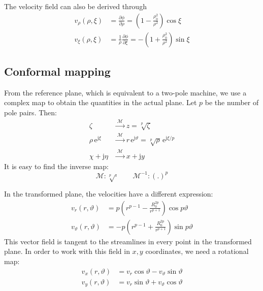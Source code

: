 \documentclass[b5paper,11pt,oneside,fleqn]{article}
\newcommand{\eu}{\mathrm{e}}
\newcommand{\je}{\mathrm{j}}
\newcommand{\te}{\vartheta}
\newcommand{\map}{\mathcal{M}}
\newcommand{\de}{\partial}
\begin{document}
The velocity field can also be derived through
\begin{equation}
\begin{aligned}
v_\rho(\rho,\xi)  &= \frac{\de\phi}{\de\rho} =
           \left( 1 - \frac{\rho_0^2}{\rho^2} \right) \cos\xi \\[1ex]
v_\xi(\rho,\xi)  &= \frac{1}{\rho} \frac{\de\phi}{\de\xi}  =
          -\left( 1 + \frac{\rho_0^2}{\rho^2} \right) \sin\xi
\end{aligned}
\end{equation}




\subsection{Conformal mapping}
From the reference plane, which is equivalent to a two-pole machine,
we use a complex map to obtain the quantities in the actual plane.
Let $ p $ be the number of pole pairs. Then:
\begin{equation}
\begin{aligned}
\zeta              &\xrightarrow{\;\map\;} z = \sqrt[p]{\zeta} \\
\rho\,\eu^{\je\xi} &\xrightarrow{\;\map\;}
                       r \, \eu^{\je\te} = \sqrt[p]{\rho}\,\eu^{\je
                       \xi/p} \\
\chi + \je\eta     &\xrightarrow{\;\map\;} x + \je y
\end{aligned}
\end{equation}
%
It is easy to find the inverse map:
\begin{equation}
\map\colon \sqrt[p]{\cdot} \qquad
\map^{-1}\colon (.)^p
\end{equation}

In the transformed plane, the velocities have a different expression:
\begin{equation}
\begin{aligned}
v_r(r,\te)  &=
p \left( r^{p-1} - \frac{R_0^{2p}}{r^{p+1}} \right) \cos p\te \\[1ex]
v_\te(r,\te)  &=
-p \left( r^{p-1} + \frac{R_0^{2p}}{r^{p+1}} \right) \sin p\te
\end{aligned}
\end{equation}
%
This vector field is tangent to the streamlines in every point in the
transformed plane. In order to work with this field in $ x,y $ coordinates, we
need a rotational map:
\begin{equation}
\begin{aligned}
v_x(r,\te) &= v_r \cos\te - v_\te \sin\te \\
v_y(r,\te) &= v_r \sin\te + v_\te \cos\te
\end{aligned}
\end{equation}
\end{document}
